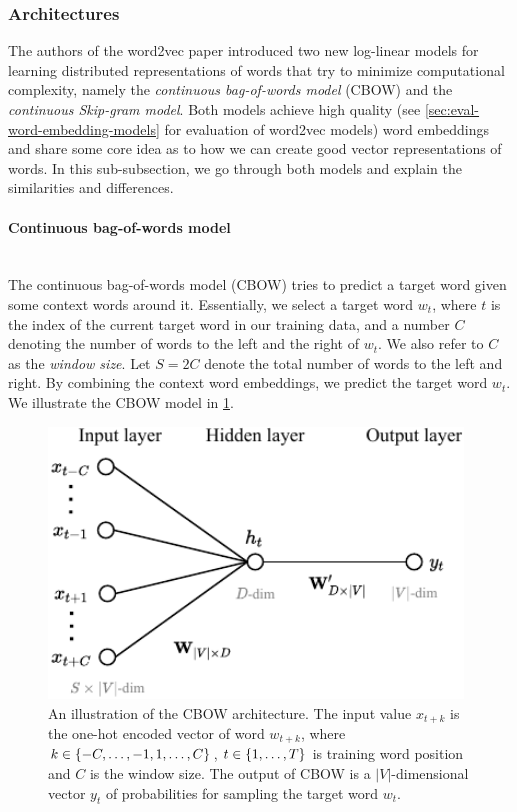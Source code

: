 \subsubsection{Architectures}
The authors of the word2vec paper introduced two new log-linear models for learning distributed representations of words that try to minimize computational complexity, namely the \textit{continuous bag-of-words model} (CBOW) and the \textit{continuous Skip-gram model}. Both models achieve high quality (see \cref{sec:eval-word-embedding-models} for evaluation of word2vec models) word embeddings and share some core idea as to how we can create good vector representations of words. In this sub-subsection, we go through both models and explain the similarities and differences.

\paragraph*{Continuous bag-of-words model}\mbox{} \\
The continuous bag-of-words model (CBOW) tries to predict a target word given some context words around it. Essentially, we select a target word $w_t$, where $t$ is the index of the current target word in our training data, and a number $C$ denoting the number of words to the left and the right of $w_t$. We also refer to $C$ as the \textit{window size}. Let $S=2C$ denote the total number of words to the left and right. By combining the context word embeddings, we predict the target word $w_t$. We illustrate the CBOW model in \cref{fig:cbow-model}.
\begin{figure}[H]
    \centering
    \includegraphics[width=11cm]{thesis/figures/cbow_cropped.pdf}
    \caption{An illustration of the CBOW architecture. The input value $x_{t+k}$ is the one-hot encoded vector of word $w_{t+k}$, where $k \in \left\{-C, \ldots, -1, 1, \ldots, C\right\}$, $t \in \left\{1, \ldots, T\right\}$ is training word position and $C$ is the window size. The output of CBOW is a $|V|$-dimensional vector $y_t$ of probabilities for sampling the target word $w_t$.}
    \label{fig:cbow-model}
\end{figure}

